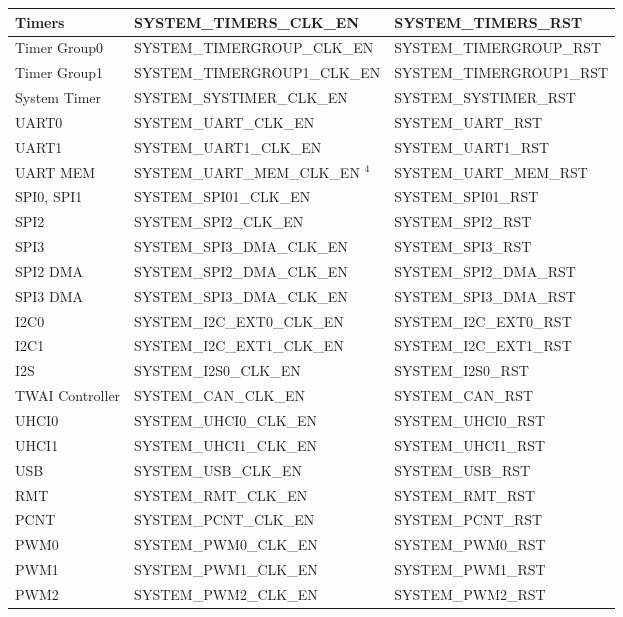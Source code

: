 \documentclass[main\_\_EN.tex]{subfiles}
\begin{document}
\begin{longtable}[c]{ |p{4cm}|p{6cm}|p{6cm}| }
Timers    & SYSTEM\_TIMERS\_CLK\_EN & SYSTEM\_TIMERS\_RST \\\hline
Timer Group0    & SYSTEM\_TIMERGROUP\_CLK\_EN & SYSTEM\_TIMERGROUP\_RST \\\hline
Timer Group1    & SYSTEM\_TIMERGROUP1\_CLK\_EN & SYSTEM\_TIMERGROUP1\_RST \\\hline
System Timer    & SYSTEM\_SYSTIMER\_CLK\_EN & SYSTEM\_SYSTIMER\_RST \\\hline
UART0    & SYSTEM\_UART\_CLK\_EN & SYSTEM\_UART\_RST \\\hline
UART1    & SYSTEM\_UART1\_CLK\_EN & SYSTEM\_UART1\_RST \\\hline
UART MEM    & SYSTEM\_UART\_MEM\_CLK\_EN {\hyperref[table:reset_notes]{$^4$}} & SYSTEM\_UART\_MEM\_RST \\\hline
SPI0, SPI1    & SYSTEM\_SPI01\_CLK\_EN & SYSTEM\_SPI01\_RST \\\hline
SPI2    & SYSTEM\_SPI2\_CLK\_EN & SYSTEM\_SPI2\_RST \\\hline
SPI3    & SYSTEM\_SPI3\_DMA\_CLK\_EN & SYSTEM\_SPI3\_RST \\\hline
SPI2 DMA    & SYSTEM\_SPI2\_DMA\_CLK\_EN & SYSTEM\_SPI2\_DMA\_RST \\\hline
SPI3 DMA    & SYSTEM\_SPI3\_DMA\_CLK\_EN & SYSTEM\_SPI3\_DMA\_RST \\\hline
I2C0    & SYSTEM\_I2C\_EXT0\_CLK\_EN & SYSTEM\_I2C\_EXT0\_RST \\\hline
I2C1    & SYSTEM\_I2C\_EXT1\_CLK\_EN & SYSTEM\_I2C\_EXT1\_RST \\\hline
I2S    & SYSTEM\_I2S0\_CLK\_EN & SYSTEM\_I2S0\_RST \\\hline
TWAI Controller    & SYSTEM\_CAN\_CLK\_EN & SYSTEM\_CAN\_RST \\\hline
UHCI0    & SYSTEM\_UHCI0\_CLK\_EN & SYSTEM\_UHCI0\_RST \\\hline
UHCI1    & SYSTEM\_UHCI1\_CLK\_EN & SYSTEM\_UHCI1\_RST \\\hline
USB    & SYSTEM\_USB\_CLK\_EN & SYSTEM\_USB\_RST \\\hline
RMT    & SYSTEM\_RMT\_CLK\_EN & SYSTEM\_RMT\_RST \\\hline
PCNT    & SYSTEM\_PCNT\_CLK\_EN & SYSTEM\_PCNT\_RST \\\hline
PWM0    & SYSTEM\_PWM0\_CLK\_EN & SYSTEM\_PWM0\_RST \\\hline
PWM1    & SYSTEM\_PWM1\_CLK\_EN & SYSTEM\_PWM1\_RST \\\hline
PWM2    & SYSTEM\_PWM2\_CLK\_EN & SYSTEM\_PWM2\_RST \\\hline

\end{longtable}
\end{document}
